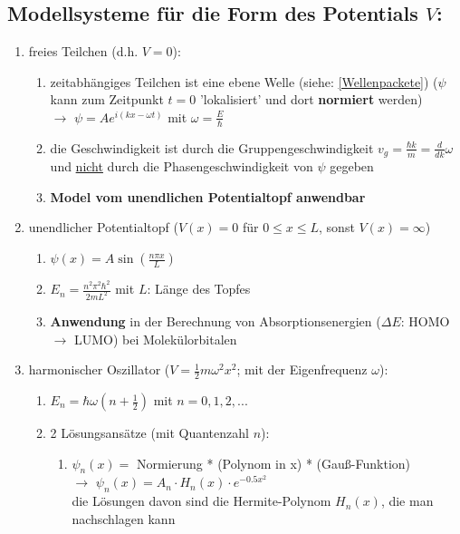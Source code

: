\subsection{Modellsysteme für die Form des Potentials $V$:}
\begin{enumerate}
    \item freies Teilchen (d.h. $V=0$):
    \begin{enumerate}
        \item zeitabhängiges Teilchen ist eine ebene Welle (siehe: \ref{Wellenpackete}) ($\psi$ kann zum Zeitpunkt $t=0$ 'lokalisiert'  
        und dort \textbf{normiert} werden) \\
        $\rightarrow$ $\psi =Ae^{i(kx-\omega t)}$ mit $\omega=\frac{E}{\hbar}$
        \item die Geschwindigkeit ist durch die Gruppengeschwindigkeit $v_g=\frac{\hbar k}{m}=\frac{d}{dk}\omega$ und \underline{nicht}
        durch die Phasengeschwindigkeit von $\psi$ gegeben
        \item \textbf{Model vom unendlichen Potentialtopf anwendbar}
    \end{enumerate}
    \item unendlicher Potentialtopf ($V(x)=0$ für $0\leq x\leq L$, sonst $V(x)=\infty$)
        \begin{enumerate}
            \item $\psi(x)=A\sin(\frac{n\pi x}{L})$
            \item $E_n=\frac{n^2 \pi^2 \hbar^2}{2mL^2}$ mit $L$: Länge des Topfes 
            \item \textbf{Anwendung} in der Berechnung von Absorptionsenergien ($\Delta E$: HOMO $\rightarrow$ LUMO) bei Molekülorbitalen 
        \end{enumerate} 
    \item harmonischer Oszillator ($V=\frac{1}{2}m\omega^2x^2$; mit der Eigenfrequenz $\omega$):
    \begin{enumerate}
        \item $E_n=\hbar\omega(n+\frac{1}{2})$ mit $n=0,1,2,...$
        \item 2 Lösungsansätze (mit Quantenzahl $n$):
        \begin{enumerate}
            \item $\psi_n(x)=$ Normierung * (Polynom in x) * (Gauß-Funktion)\\
            $\rightarrow$ $\psi_n(x)=A_n\cdot H_n(x) \cdot e^{-0.5x^2}$ \\
            die Lösungen davon sind die Hermite-Polynom $H_n(x)$, die man nachschlagen kann

\end{enumerate}
\end{enumerate}
\end{enumerate}
